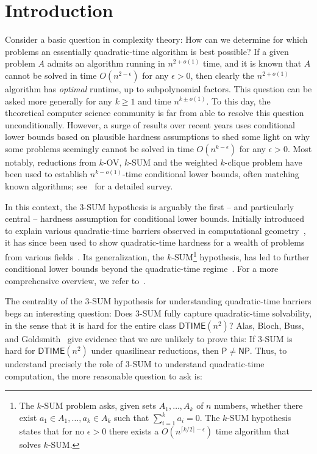 \section{Introduction}
Consider a basic question in complexity theory: How can we determine for which problems an essentially quadratic-time algorithm is best possible? If a given problem $A$ admits an algorithm running in $n^{2+o(1)}$ time, and it is known that $A$ cannot be solved in time $O(n^{2-\epsilon})$ for any $\epsilon>0$, then clearly the $n^{2+o(1)}$ algorithm has \emph{optimal} runtime, up to subpolynomial factors.
This question can be asked more generally for any $k\geq 1$ and time $n^{k \pm o(1)}$.
To this day, the theoretical computer science community is far from able to resolve this question unconditionally. However, a surge of results over recent years uses
conditional lower bounds based on plausible hardness assumptions to shed some light on why some problems seemingly cannot be solved in time $O(n^{k-\epsilon})$ for any $\epsilon >0$.
Most notably, reductions from $k$-OV, $k$-SUM and the weighted $k$-clique problem have been used to establish $n^{k-o(1)}$-time conditional lower bounds, often matching known algorithms; see~\cite{williams2018some} for a detailed survey.

In this context, the $3$-SUM hypothesis is arguably the first -- and particularly central -- 
hardness assumption for conditional lower bounds. Initially introduced to explain various quadratic-time barriers
observed in computational geometry~\cite{DBLP:journals/comgeo/GajentaanO95}, it has since been used to 
show quadratic-time hardness for a wealth of problems from various 
fields~\cite{DBLP:journals/siamcomp/WilliamsW13, DBLP:conf/stoc/Patrascu10,DBLP:conf/focs/AbboudW14, DBLP:conf/soda/KopelowitzPP16, DBLP:conf/stoc/0001GS20, DBLP:conf/stoc/AbboudBKZ22, DBLP:conf/stoc/ChanWX22}.
Its generalization, the $k$-SUM\footnote{The $k$-SUM problem asks, given sets $A_1,\dots ,A_k$ of $n$ numbers, whether there exist $a_1 \in A_1 ,\dots ,a_k \in A_k$ such that $\sum_{i=1}^{k}a_i=0$.
The $k$-SUM hypothesis states that for no $\epsilon>0$ there exists a $O(n^{\lceil k/2 \rceil-\epsilon})$ time algorithm that solves $k$-SUM.} hypothesis, has led to further conditional lower bounds beyond the quadratic-time
regime~\cite{DBLP:journals/siamcomp/Erickson99, DBLP:conf/icalp/AbboudL13, DBLP:conf/focs/AbboudBBK17, DBLP:conf/nips/AbboudBBK20, DBLP:conf/focs/Kunnemann22}. For a more comprehensive overview, we refer to~\cite{williams2018some}.

The centrality of the $3$-SUM hypothesis for understanding quadratic-time barriers begs an interesting question: Does $3$-SUM fully capture quadratic-time solvability, in the sense that it is hard for the entire class $\mathsf{DTIME}(n^2)$? Alas, Bloch, Buss, and Goldsmith~\cite{bloch1994hard} give evidence that we are unlikely to prove this: If $3$-SUM is hard for $\mathsf{DTIME}(n^2)$ under quasilinear reductions, then $\mathsf{P} \ne \mathsf{NP}$.
Thus, to understand precisely the role of $3$-SUM to understand quadratic-time computation, the more reasonable question to ask is: 

